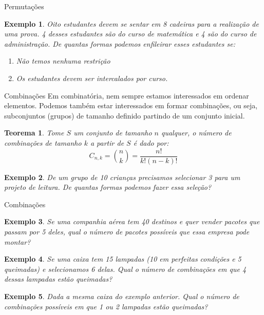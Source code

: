 \documentclass{beamer}
\newtheorem{teorema}{Teorema}
\newtheorem{exemplo}{Exemplo}
\begin{document}
\begin{frame}{Permutações}
    \begin{exemplo}
        Oito estudantes devem se sentar em 8 cadeiras para a realização de uma prova. 4 desses estudantes são do curso de matemática e 4 são do curso de administração. De quantas formas podemos enfileirar esses estudantes se:
        \begin{enumerate}
            \item Não temos nenhuma restrição
            \item Os estudantes devem ser intercalados por curso.
        \end{enumerate}
    \end{exemplo}
\end{frame}

\begin{frame}{Combinações}
    Em combinatória, nem sempre estamos interessados em ordenar elementos. Podemos também estar interessados em formar combinações, ou seja, subconjuntos (grupos) de tamanho definido partindo de um conjunto inicial. 
    \pause
    \begin{teorema}
        Tome $S$ um conjunto de tamanho $n$ qualquer, o número de combinações de tamanho $k$ a  partir de $S$ é dado por:
        $$C_{n,k} = \binom{n}{k} = \dfrac{n!}{k!(n-k)!}$$
    \end{teorema}

    \pause
    \begin{exemplo}
        De um grupo de 10 crianças precisamos selecionar 3 para um projeto de leitura. De quantas formas podemos fazer essa seleção?
    \end{exemplo}
\end{frame}

\begin{frame}{Combinações}

\begin{exemplo}
    Se uma companhia aérea tem 40 destinos e quer vender pacotes que passam por 5 deles, qual o número de pacotes possíveis que essa empresa pode montar?
\end{exemplo}

\pause
\begin{exemplo}
    Se uma caixa tem 15 lampadas (10 em perfeitas condições e 5 queimadas) e selecionamos 6 delas. Qual o número de combinações em que 4 dessas lampadas estão queimadas?
\end{exemplo}
\pause
\begin{exemplo}
    Dada a mesma caixa do exemplo anterior. Qual o número de combinações possíveis em que 1 ou 2 lampadas estão queimadas?
\end{exemplo}
\end{frame}
\end{document}
